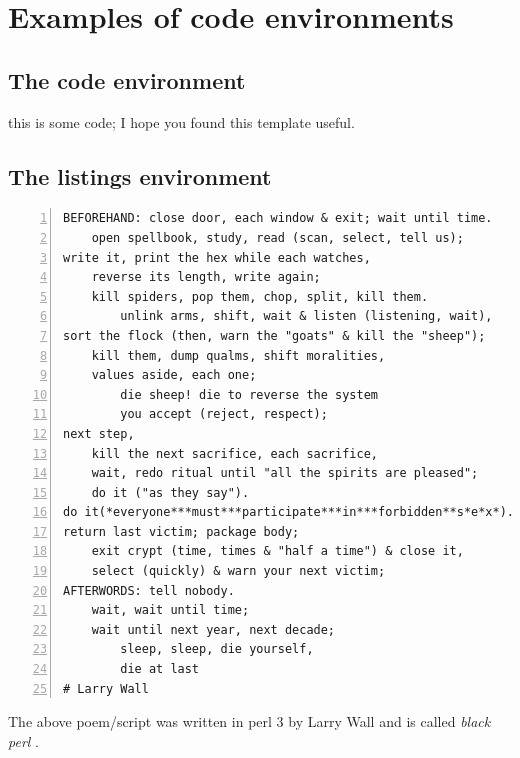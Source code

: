 
\appendix
\chapter{Examples of code environments}

\section{The code environment}

\begin{code}
this is some code;
I hope you found this template useful.
\end{code}

\section{The listings environment}

\begin{minipage}{\textwidth}
\begin{lstlisting}[numbers=left]
BEFOREHAND: close door, each window & exit; wait until time.
    open spellbook, study, read (scan, select, tell us);
write it, print the hex while each watches,
    reverse its length, write again;
    kill spiders, pop them, chop, split, kill them.
        unlink arms, shift, wait & listen (listening, wait),
sort the flock (then, warn the "goats" & kill the "sheep");
    kill them, dump qualms, shift moralities,
    values aside, each one;
        die sheep! die to reverse the system
        you accept (reject, respect);
next step,
    kill the next sacrifice, each sacrifice,
    wait, redo ritual until "all the spirits are pleased";
    do it ("as they say").
do it(*everyone***must***participate***in***forbidden**s*e*x*).
return last victim; package body;
    exit crypt (time, times & "half a time") & close it,
    select (quickly) & warn your next victim;
AFTERWORDS: tell nobody.
    wait, wait until time;
    wait until next year, next decade;
        sleep, sleep, die yourself,
        die at last
# Larry Wall
\end{lstlisting}
\end{minipage}

The above poem/script was written in perl 3 by Larry Wall and is called \textit{black perl} \cite{blackPerl}.
